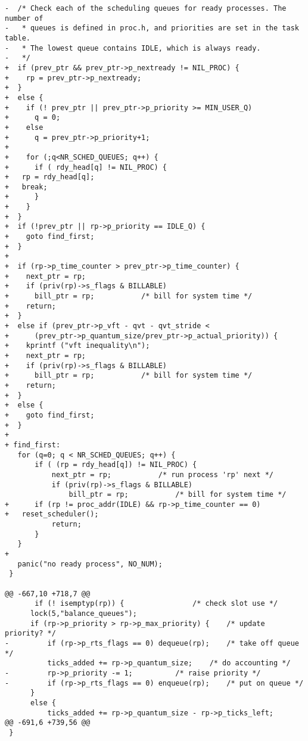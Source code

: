 \begin{verbatim}
-  /* Check each of the scheduling queues for ready processes. The number of
-   * queues is defined in proc.h, and priorities are set in the task table.
-   * The lowest queue contains IDLE, which is always ready.
-   */
+  if (prev_ptr && prev_ptr->p_nextready != NIL_PROC) {
+    rp = prev_ptr->p_nextready;
+  }
+  else {
+    if (! prev_ptr || prev_ptr->p_priority >= MIN_USER_Q)
+      q = 0;
+    else
+      q = prev_ptr->p_priority+1;
+
+    for (;q<NR_SCHED_QUEUES; q++) {
+      if ( rdy_head[q] != NIL_PROC) {
+	rp = rdy_head[q];
+	break;
+      }
+    }
+  }
+  if (!prev_ptr || rp->p_priority == IDLE_Q) {
+    goto find_first;
+  }
+
+  if (rp->p_time_counter > prev_ptr->p_time_counter) {
+    next_ptr = rp;
+    if (priv(rp)->s_flags & BILLABLE)	 	
+      bill_ptr = rp;			/* bill for system time */
+    return;
+  }
+  else if (prev_ptr->p_vft - qvt - qvt_stride < 
+	   (prev_ptr->p_quantum_size/prev_ptr->p_actual_priority)) {
+    kprintf ("vft inequality\n");
+    next_ptr = rp;
+    if (priv(rp)->s_flags & BILLABLE)	 	
+      bill_ptr = rp;			/* bill for system time */
+    return;
+  }
+  else {
+    goto find_first;
+  }
+
+ find_first:
   for (q=0; q < NR_SCHED_QUEUES; q++) {	
       if ( (rp = rdy_head[q]) != NIL_PROC) {
           next_ptr = rp;			/* run process 'rp' next */
           if (priv(rp)->s_flags & BILLABLE)	 	
               bill_ptr = rp;			/* bill for system time */
+      if (rp != proc_addr(IDLE) && rp->p_time_counter == 0)
+	reset_scheduler();
           return;				 
       }
   }
+
   panic("no ready process", NO_NUM);
 }
 
@@ -667,10 +718,7 @@
       if (! isemptyp(rp)) {				/* check slot use */
 	  lock(5,"balance_queues");
 	  if (rp->p_priority > rp->p_max_priority) {	/* update priority? */
-	      if (rp->p_rts_flags == 0) dequeue(rp);	/* take off queue */
 	      ticks_added += rp->p_quantum_size;	/* do accounting */
-	      rp->p_priority -= 1;			/* raise priority */
-	      if (rp->p_rts_flags == 0) enqueue(rp);	/* put on queue */
 	  }
 	  else {
 	      ticks_added += rp->p_quantum_size - rp->p_ticks_left;
@@ -691,6 +739,56 @@
 }
 

\end{verbatim}
